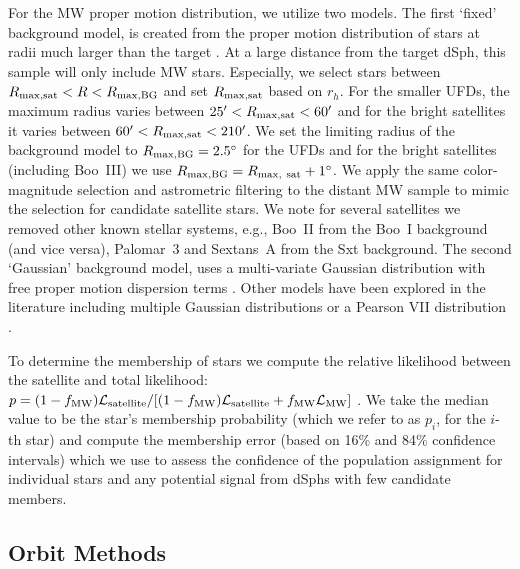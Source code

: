 \documentclass[twocolumn]{aastex63}
\begin{document}
  

For the MW proper motion distribution, we utilize two models.
The first `fixed' background model, is created from the proper motion distribution of stars  at radii much larger than the target \citep{McConnachie2020AJ....160..124M}.
At a large distance from the target dSph, this sample will  only include MW stars.
Especially, we select stars between $R_{\rm max, sat} < R < R_{\rm max, BG}$ and set $R_{\rm max, sat}$ based on $r_h$.  For the smaller UFDs,  the maximum radius varies between $25\mbox{$^\prime$} <R_{\rm max, sat}<60\mbox{$^\prime$}$ and for the bright satellites it varies between $60\mbox{$^\prime$} <R_{\rm max, sat}<210\mbox{$^\prime$}$.
We set the  limiting radius of the background model to  $R_{\rm max, BG}=2.5^\circ$ for the UFDs and for the bright satellites (including Boo~III) we use $R_{\rm max, BG}=R_{\rm max,~sat}+1^\circ$.
We apply the same color-magnitude selection and astrometric filtering to the distant MW sample to mimic  the selection for candidate satellite stars.  
We note for several satellites we removed other known stellar systems, e.g., Boo~II from the Boo~I background (and vice versa), Palomar~3 and Sextans~A from the Sxt background. 
The second `Gaussian' background model, uses a multi-variate Gaussian distribution with free proper motion dispersion terms \citep[e.g.,][]{Pace2019ApJ...875...77P}. 
Other models have been explored in the literature including multiple Gaussian distributions \citep[e.g.,][]{Pace2019ApJ...875...77P, Vasiliev2021MNRAS.505.5978V}
or a Pearson VII distribution \citep{Vitral2021MNRAS.504.1355V}.

To determine the membership of stars we compute the relative likelihood between the satellite and total likelihood: $p = (1- f_{\rm MW})\mathcal{L}_{\rm satellite}/[(1- f_{\rm MW}) \mathcal{L}_{\rm satellite} + f_{\rm MW}\mathcal{L}_{\rm MW}]$ \citep[e.g.,][]{Martinez2011ApJ...738...55M}.  We take the median value to be the star's membership probability (which we refer to as $p_i$, for the $i$-th star) and compute the membership error (based on 16\% and 84\% confidence intervals) which we use to assess the confidence of the population  assignment for individual stars and any potential signal from  dSphs with few candidate members.


\subsection{Orbit Methods} \label{sec:orbit_method}
\end{document}
